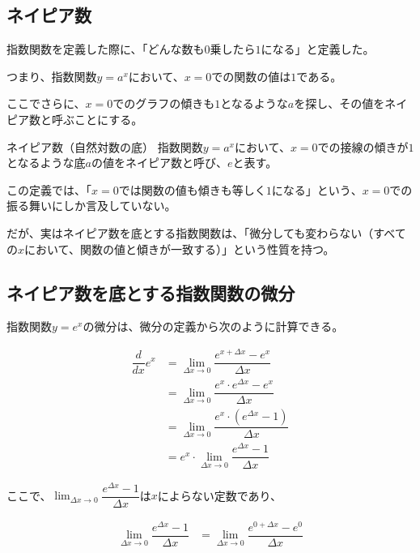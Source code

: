 \documentclass[../math-imaging]{subfiles}
\begin{document}
\subsection{ネイピア数}

指数関数を定義した際に、「どんな数も$0$乗したら$1$になる」と定義した。

つまり、指数関数$y=a^x$において、$x=0$での関数の値は$1$である。

ここでさらに、$x=0$でのグラフの傾きも$1$となるような$a$を探し、その値をネイピア数と呼ぶことにする。

\begin{definition}{ネイピア数（自然対数の底）}
  \newline
  指数関数$y=a^x$において、$x=0$での接線の傾きが$1$となるような底$a$の値をネイピア数と呼び、$e$と表す。
\end{definition}

この定義では、「$x=0$では関数の値も傾きも等しく$1$になる」という、$x=0$での振る舞いにしか言及していない。

だが、実はネイピア数を底とする指数関数は、「微分しても変わらない（すべての$x$において、関数の値と傾きが一致する）」という性質を持つ。

\subsection{ネイピア数を底とする指数関数の微分}

指数関数$y=e^x$の微分は、微分の定義から次のように計算できる。

\begin{align}
  \dfrac{d}{dx}e^x & = \lim_{\Delta x \to 0} \dfrac{e^{x+\Delta x} - e^x}{\Delta x}         \\
                   & = \lim_{\Delta x \to 0} \dfrac{e^x \cdot e^{\Delta x} - e^x}{\Delta x} \\
                   & = \lim_{\Delta x \to 0} \dfrac{e^x \cdot (e^{\Delta x} - 1)}{\Delta x} \\
                   & = e^x \cdot \lim_{\Delta x \to 0} \dfrac{e^{\Delta x} - 1}{\Delta x}
\end{align}

ここで、$\displaystyle\lim_{\Delta x \to 0} \dfrac{e^{\Delta x} - 1}{\Delta x}$は$x$によらない定数であり、

\begin{align}
  \lim_{\Delta x \to 0} \dfrac{e^{\Delta x} - 1}{\Delta x} & = \lim_{\Delta x \to 0} \dfrac{e^{0 + \Delta x} - e^0}{\Delta x}
\end{align}
\end{document}

